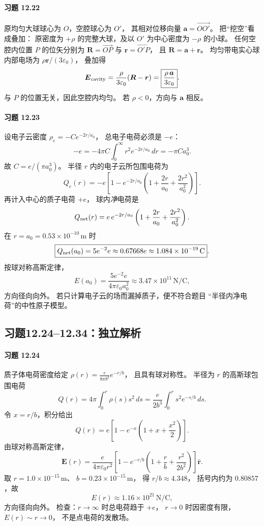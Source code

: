 \paragraph{习题 12.22}
原均匀大球球心为 \(O\)，空腔球心为 \(O'\)，
其相对位移向量 \(\boldsymbol a=\overrightarrow{OO'}\)。
把“挖空”看成叠加：
原密度为 \(+\rho\) 的完整大球，及以
\(O'\) 为中心密度为 \(-\rho\) 的小球。
任何空腔内位置 \(P\) 的位矢分别为
\(\boldsymbol R=\overrightarrow{OP}\) 与
\(\boldsymbol r=\overrightarrow{O'P}\)，
且 \(\boldsymbol R=\boldsymbol a+\boldsymbol r\)。
均匀带电实心球内部电场为
\(\rho\boldsymbol r/(3\varepsilon_0)\)，
叠加得
\[
 \boldsymbol E_{\rm cavity}
 =\frac{\rho}{3\varepsilon_0}
 (\boldsymbol R-\boldsymbol r)
 =\boxed{\frac{\rho\,\boldsymbol a}{3\varepsilon_0}}.
\]
与 \(P\) 的位置无关，因此空腔内均匀。
若 \(\rho<0\)，方向与 \(\boldsymbol a\) 相反。

\paragraph{习题 12.23}
设电子云密度 \(\rho_e=-C e^{-2r/a_0}\)，
总电子电荷必须是 \(-e\)：
\[
 -e=-4\pi C\int_0^\infty r^2e^{-2r/a_0}\,dr
 =-\pi C a_0^3.
\]
故 \(\boxed{C=e/(\pi a_0^3)}\)。
半径 \(r\) 内的电子云所包围电荷为
\[
 Q_e(r)=-e\left[1-e^{-2r/a_0}
 \left(1+\frac{2r}{a_0}+\frac{2r^2}{a_0^2}\right)\right].
\]
再计入中心的质子电荷 \(+e\)，
球内\emph{净}电荷是
\[
 Q_{\rm net}(r)=e\,e^{-2r/a_0}
 \left(1+\frac{2r}{a_0}+\frac{2r^2}{a_0^2}\right).
\]
在 \(r=a_0=0.53\times10^{-10}\,\mathrm m\) 时
\[
 \boxed{Q_{\rm net}(a_0)=5e^{-2}e
 \approx0.67668e\approx1.084\times10^{-19}\,\mathrm C}.
\]
按球对称高斯定律，
\[
 \boxed{E(a_0)=\frac{5e^{-2}e}
 {4\pi\varepsilon_0a_0^2}
 \approx3.47\times10^{11}\,\mathrm{N/C}},
\]
方向径向向外。
若只计算电子云的场而漏掉质子，便不符合题目
“半径内净电荷”的中性原子模型。


\subsection*{习题12.24--12.34：独立解析}
\paragraph{习题 12.24}
质子体电荷密度给定
\(\rho(r)=\frac{e}{8\pi b^3}e^{-r/b}\)，
且具有球对称性。
半径为 \(r\) 的高斯球包围电荷
\[
 Q(r)=4\pi\int_0^r \rho(s)s^2\,ds
 =\frac{e}{2b^3}\int_0^rs^2e^{-s/b}\,ds.
\]
令 \(x=r/b\)，积分给出
\[
 \boxed{Q(r)=e\left[
 1-e^{-x}\left(1+x+\frac{x^2}{2}\right)\right]}.
\]
由球对称高斯定律，
\[
 \boxed{\boldsymbol E(r)=
 \frac{e}{4\pi\varepsilon_0r^2}
 \left[1-e^{-r/b}\left(1+\frac rb+\frac{r^2}{2b^2}\right)\right]
 \hat{\boldsymbol r}}.
\]
取 \(r=1.0\times10^{-15}\,\mathrm m\)、
\(b=0.23\times10^{-15}\,\mathrm m\)，
得 \(r/b\approx4.348\)，
括号内约为 \(0.80857\)，故
\[
 \boxed{E(r)\approx1.16\times10^{21}\,\mathrm{N/C}},
\]
方向径向向外。
检查：\(r\to\infty\) 时总电荷趋于 \(+e\)，
\(r\to0\) 时因密度有限，\(E(r)\sim r\to0\)，
不是点电荷的发散场。

